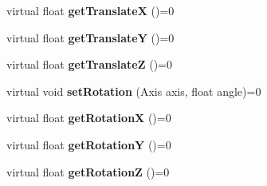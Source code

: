 \begin{DoxyCompactItemize}
\item 
\hypertarget{class_game_object_a1d0422282bbb5f85bc6987ec46c6b276}{virtual float {\bfseries get\-Translate\-X} ()=0}\label{class_game_object_a1d0422282bbb5f85bc6987ec46c6b276}

\item 
\hypertarget{class_game_object_a22f094a0b08f06855ecbd17b9845ef50}{virtual float {\bfseries get\-Translate\-Y} ()=0}\label{class_game_object_a22f094a0b08f06855ecbd17b9845ef50}

\item 
\hypertarget{class_game_object_ac0efd129c13bf95753299fe85f97467a}{virtual float {\bfseries get\-Translate\-Z} ()=0}\label{class_game_object_ac0efd129c13bf95753299fe85f97467a}

\item 
\hypertarget{class_game_object_a1144922a11a0e343366a8a3fb8521725}{virtual void {\bfseries set\-Rotation} (Axis axis, float angle)=0}\label{class_game_object_a1144922a11a0e343366a8a3fb8521725}

\item 
\hypertarget{class_game_object_ab46716c3230c5d11eebff87c84ca22f5}{virtual float {\bfseries get\-Rotation\-X} ()=0}\label{class_game_object_ab46716c3230c5d11eebff87c84ca22f5}

\item 
\hypertarget{class_game_object_a6c98f336114110131ad3215409b23534}{virtual float {\bfseries get\-Rotation\-Y} ()=0}\label{class_game_object_a6c98f336114110131ad3215409b23534}

\item 
\hypertarget{class_game_object_ac377db42aef03de064f7bd06336a0be6}{virtual float {\bfseries get\-Rotation\-Z} ()=0}\label{class_game_object_ac377db42aef03de064f7bd06336a0be6}

\end{DoxyCompactItemize}
